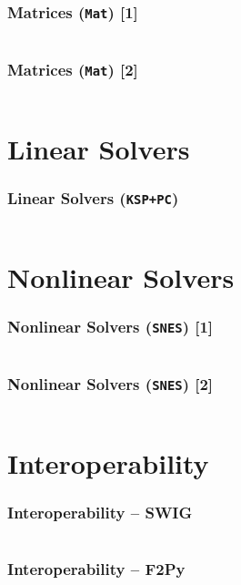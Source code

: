 \documentclass{beamer}
\begin{document}
\begin{frame}
  \frametitle{Matrices (\texttt{Mat}) [1]}
  \small\inputminted[linenos]{python}{petsc4py_mat_1.py}
\end{frame}

\begin{frame}
  \frametitle{Matrices (\texttt{Mat}) [2]}
  \small\inputminted[linenos]{python}{petsc4py_mat_2.py}
\end{frame}


\section{Linear Solvers}

\begin{frame}
  \frametitle{Linear Solvers (\texttt{KSP+PC})}
  \small\inputminted[linenos,firstline=3]{python}{petsc4py_ksp.py}
\end{frame}


\section{Nonlinear Solvers}

\begin{frame}
  \frametitle{Nonlinear Solvers (\texttt{SNES}) [1]}
  \scriptsize\inputminted[linenos]{python}{petsc4py_snes_1.py}
\end{frame}

\begin{frame}
  \frametitle{Nonlinear Solvers (\texttt{SNES}) [2]}
  \small\inputminted[linenos]{python}{petsc4py_snes_2.py}
\end{frame}


\section{Interoperability}

\begin{frame}
  \frametitle{Interoperability -- \textbf{SWIG}}
  \small
  \inputminted[linenos]{c}{wrap_swig.i}
\end{frame}

\begin{frame}
  \frametitle{Interoperability -- \textbf{F2Py}}
  \scriptsize
  \inputminted[linenos]{fortran}{wrap_f2py.pyf}
\end{frame}
\end{document}
